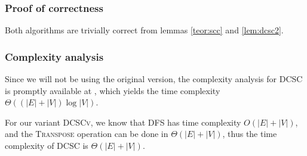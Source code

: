 \subsubsection{Proof of correctness}
Both algorithms are trivially correct from lemmas \ref{teor:scc} and \ref{lem:dcsc2}.
\subsubsection{Complexity analysis}
Since we will not be using the original version, the complexity analysis for \textsc{DCSC} is promptly available at \cite{fleischer-dcsc}, which yields the time complexity $\Theta((|E|+|V|) \log |V|)$.\par
For our variant \textsc{DCSCv}, we know that \textsc{DFS} has time complexity $O(|E|+|V|)$, and the \textsc{Transpose} operation can be done in $\Theta(|E|+|V|)$, thus the time complexity of \textsc{DCSC} is $\Theta(|E|+|V|)$.
